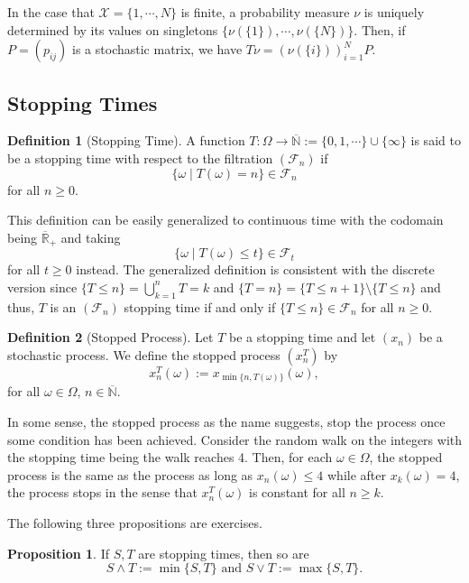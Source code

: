 \documentclass[]{article}
\theoremstyle{definition}
\theoremstyle{definition}
\newtheorem{definition}{Definition}[section]
\newtheorem{proposition}{Proposition}[section]
\begin{document}
In the case that \(\mathcal{X} = \{1, \cdots, N\}\) is finite, a probability 
measure \(\nu\) is uniquely determined by its values on singletons 
\(\{\nu(\{1\}), \cdots, \nu(\{N\})\}\). Then, if \(P = (p_{ij})\) is a stochastic matrix,
we have \(T\nu = (\nu(\{i\}))_{i = 1}^N P\).

\subsection{Stopping Times}

\begin{definition}[Stopping Time]
  A function \(T : \Omega \to \overline{\mathbb{N}} := \{0, 1, \cdots \} \cup \{\infty\}\) 
  is said to be a stopping time with respect to the filtration \((\mathcal{F}_n)\) if 
  \[\{\omega \mid T(\omega) = n\} \in \mathcal{F}_n\]
  for all \(n \ge 0\).
\end{definition}

This definition can be easily generalized to continuous time with the codomain 
being \(\overline{\mathbb{R}}_+\) and taking 
\[\{\omega \mid T(\omega) \le t\} \in \mathcal{F}_t\]
for all \(t \ge 0\) instead. The generalized definition is consistent with the 
discrete version since \(\{T \le n\} = \bigcup_{k = 1}^n {T = k}\) and 
\(\{T = n\} = \{T \le n + 1\} \setminus \{T \le n\}\) and thus, 
\(T\) is an \((\mathcal{F}_n)\) stopping time if and only if \(\{T \le n\} \in \mathcal{F}_n\) 
for all \(n \ge 0\).

\begin{definition}[Stopped Process]
  Let \(T\) be a stopping time and let \((x_n)\) be a stochastic process. We define 
  the stopped process \((x^T_n)\) by 
  \[x^T_n(\omega) := x_{\min \{n, T(\omega)\}}(\omega),\]
  for all \(\omega \in \Omega\), \(n \in \overline{\mathbb{N}}\).
\end{definition}

In some sense, the stopped process as the name suggests, stop the process once some 
condition has been achieved. Consider the random walk on the integers with the 
stopping time being the walk reaches 4. Then, for each \(\omega \in \Omega\), 
the stopped process is the same as the process as long as \(x_n(\omega) \le 4\) 
while after \(x_k(\omega) = 4\), the process stops in the sense that 
\(x^T_n(\omega)\) is constant for all \(n \ge k\).

The following three propositions are exercises.

\begin{proposition}
  If \(S, T\) are stopping times, then so are 
  \[S \wedge T := \min\{S, T\} \text{ and } S \vee T := \max\{S, T\}.\]
\end{proposition}
\end{document}

